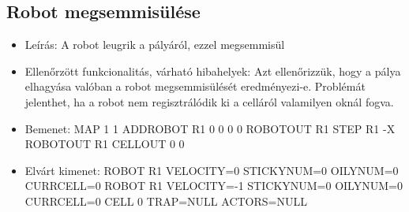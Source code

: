 \subsection{Robot megsemmisülése}
\begin{itemize}
	\item Leírás: \newline
A robot leugrik a pályáról, ezzel megsemmisül
	\item Ellenőrzött funkcionalitás, várható hibahelyek: \newline
Azt ellenőrizzük, hogy a pálya elhagyása valóban a robot megsemmisülését eredményezi-e. Problémát jelenthet, ha a robot nem regisztrálódik ki a celláról valamilyen oknál fogva.

	\item Bemenet: \newline
MAP 1 1 \newline
ADDROBOT R1 0 0 0 0 \newline
ROBOTOUT R1 \newline
STEP R1 -X \newline
ROBOTOUT R1 \newline
CELLOUT 0 0

	\item Elvárt kimenet: \newline
ROBOT R1 VELOCITY=0 STICKYNUM=0 OILYNUM=0 CURRCELL=0 \newline
ROBOT R1 VELOCITY=-1 STICKYNUM=0 OILYNUM=0 CURRCELL=0 \newline
CELL 0 TRAP=NULL ACTORS=NULL \newline

\end{itemize}

